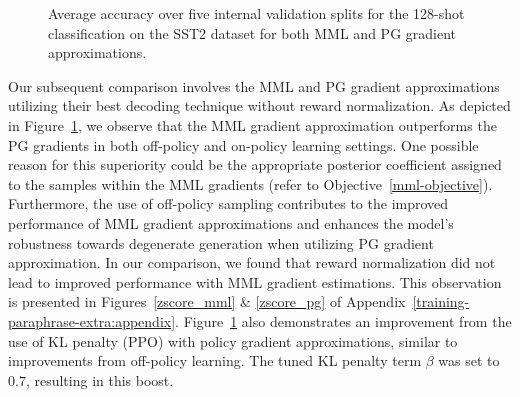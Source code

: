 \documentclass[11pt]{article}
\begin{document}
\begin{figure}[h]
\begin{center}

\end{center}
\caption{Average accuracy over five internal validation splits for the 128-shot classification on the SST2 dataset for both MML and PG gradient approximations.}
\label{mml-vs-pg}
\end{figure}

Our subsequent comparison involves the MML and PG gradient approximations utilizing their best decoding technique without reward normalization. As depicted in Figure~\ref{mml-vs-pg}, we observe that the MML gradient approximation outperforms the PG gradients in both off-policy and on-policy learning settings. One possible reason for this superiority could be the appropriate posterior coefficient assigned to the samples within the MML gradients (refer to Objective~\ref{mml-objective}). Furthermore, the use of off-policy sampling contributes to the improved performance of MML gradient approximations and enhances the model's robustness towards degenerate generation when utilizing PG gradient approximation. In our comparison, we found that reward normalization did not lead to improved performance with MML gradient estimations. This observation is presented in Figures~\ref{zscore_mml} \& \ref{zscore_pg} of Appendix~\ref{training-paraphrase-extra:appendix}. Figure~\ref{mml-vs-pg} also demonstrates an improvement from the use of KL penalty (PPO) with policy gradient approximations, similar to improvements from off-policy learning. The tuned KL penalty term $\beta$ was set to $0.7$, resulting in this boost.


\begin{comment}
Additionally, Figure~\ref{mml-vs-ppo} compares off-policy sampling with the KL penalty introduced by the PPO regularization. We initially observe that on-policy learning, after a few training steps, tends to generate degenerate paraphrases which lead to random guessing when using the binary classifier. In contrast, the KL penalty incorporated with PPO shows a higher resistance to these degenerate paraphrases. Furthermore, the MML approximation with off-policy sampling outperforms the PPO penalty as well. Off-policy sampling outperforms on-policy sampling when averaged over three decoding techniques used for drawing training samples. This holds true for both MML and PG gradient approximations (See Figure~\ref{off-policy-vs-on-policy} in Appendix~\ref{training-paraphrase-extra:appendix}). We also examined the impact of reward normalization in contrast to using the standard reward, i.e., the log-likelihood of the classifier. The corresponding validation curves for these experiments can be found in Appendix~\ref{training-paraphrase-extra:appendix}.
\end{comment}
\end{document}
